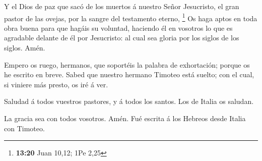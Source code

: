  Y el Dios de paz que sacó de los muertos á nuestro Señor
Jesucristo, el gran pastor de las ovejas, por la sangre del testamento
eterno, \footnote{\textbf{13:20} Juan 10,12; 1Pe 2,25} 
Os haga aptos en toda obra buena para que hagáis su voluntad, haciendo
él en vosotros lo que es agradable delante de él por Jesucristo: al cual
sea gloria por los siglos de los siglos. Amén.

 Empero os ruego, hermanos, que soportéis la palabra de
exhortación; porque os he escrito en breve.  Sabed que
nuestro hermano Timoteo está suelto; con el cual, si viniere más presto,
os iré á ver.

 Saludad á todos vuestros pastores, y á todos los santos.
Los de Italia os saludan.

 La gracia sea con todos vosotros. Amén. Fué escrita á
los Hebreos desde Italia con Timoteo.

